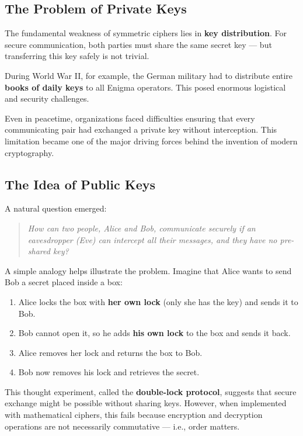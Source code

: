 \subsection{The Problem of Private Keys}

The fundamental weakness of symmetric ciphers lies in \textbf{key distribution}.  
For secure communication, both parties must share the same secret key — but transferring this key safely is not trivial.

During World War II, for example, the German military had to distribute entire \textbf{books of daily keys} to all Enigma operators.  
This posed enormous logistical and security challenges.

Even in peacetime, organizations faced difficulties ensuring that every communicating pair had exchanged a private key without interception.  
This limitation became one of the major driving forces behind the invention of modern cryptography.

\subsection{The Idea of Public Keys}

A natural question emerged:  
\begin{quote}
\textit{How can two people, Alice and Bob, communicate securely if an eavesdropper (Eve) can intercept all their messages, and they have no pre-shared key?}
\end{quote}

A simple analogy helps illustrate the problem.  
Imagine that Alice wants to send Bob a secret placed inside a box:

\begin{enumerate}
  \item Alice locks the box with \textbf{her own lock} (only she has the key) and sends it to Bob.
  \item Bob cannot open it, so he adds \textbf{his own lock} to the box and sends it back.
  \item Alice removes her lock and returns the box to Bob.
  \item Bob now removes his lock and retrieves the secret.
\end{enumerate}

This thought experiment, called the \textbf{double-lock protocol}, suggests that secure exchange might be possible without sharing keys.  
However, when implemented with mathematical ciphers, this fails because encryption and decryption operations are not necessarily commutative — i.e., order matters.

